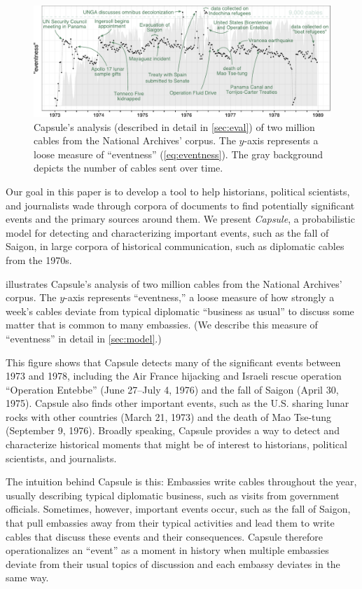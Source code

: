 \begin{figure}[ht]
\centering
\includegraphics[width=\linewidth]{fig/cables_events.pdf}
\caption{Capsule's analysis  (described in detail in \cref{sec:eval}) of two million cables from the National
  Archives' corpus. The $y$-axis represents a loose measure of
  ``eventness'' (\cref{eq:eventness}). The gray background depicts the
  number of cables sent over time.}
\label{fig:cables_events}
\end{figure}

Our goal in this paper is to develop a tool to help historians,
political scientists, and journalists wade through corpora of
documents to find potentially significant events and the primary
sources around them. We present \textit{Capsule}, a probabilistic
model for detecting and characterizing important events, such as the
fall of Saigon, in large corpora of historical communication, such as
diplomatic cables from the 1970s.

 illustrates Capsule's analysis of two million
cables from the National Archives' corpus. The \mbox{$y$-axis}
represents ``eventness,'' a loose measure of how strongly a week's
cables deviate from typical diplomatic ``business as usual'' to
discuss some matter that is common to many embassies. (We describe
this measure of ``eventness'' in detail in \cref{sec:model}.)

This figure shows that Capsule detects many of the significant events
between 1973 and 1978, including the Air France hijacking and Israeli
rescue operation ``Operation Entebbe'' (June 27--July 4, 1976) and the
fall of Saigon (April 30, 1975). Capsule also finds other important
events, such as the U.S. sharing lunar rocks with other countries
(March 21, 1973) and the death of Mao Tse-tung (September 9,
1976). Broadly speaking, Capsule provides a way to detect and
characterize historical moments that might be of interest to
historians, political scientists, and journalists.

The intuition behind Capsule is this: Embassies write cables
throughout the year, usually describing typical diplomatic business,
such as visits from government officials. Sometimes, however,
important events occur, such as the fall of Saigon, that pull
embassies away from their typical activities and lead them to write
cables that discuss these events and their consequences. Capsule
therefore operationalizes an ``event'' as a moment in history when
multiple embassies deviate from their usual topics of discussion and
each embassy deviates in the same way.

